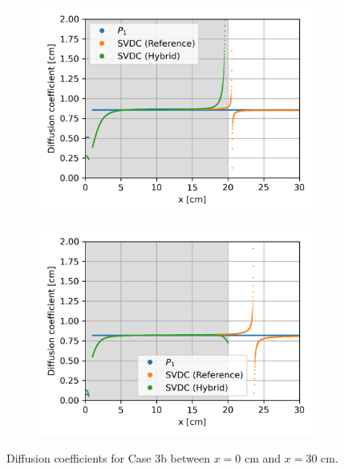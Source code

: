 \begin{frame}
\begin{figure}
\begin{subfigure}[t]{.35\textwidth}
      \centering
      \includegraphics[width=\textwidth]{images/case-3b-group-3-diffcoef}
      \label{fig:c3bg3dc}
    \end{subfigure}
    \begin{subfigure}[t]{.35\textwidth}
      \centering
      \includegraphics[width=\textwidth]{images/case-3b-group-4-diffcoef}
      \label{fig:c3bg4dc}
    \end{subfigure}
    \caption{Diffusion coefficients for Case 3b between $x=0$ cm and $x=30$ cm.}
    \label{fig:c3bdiffcoef}
  \end{figure}
\end{frame}

